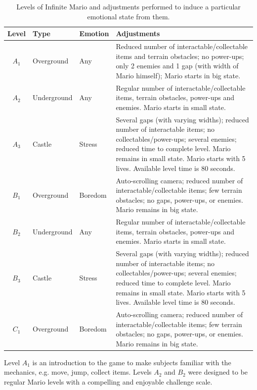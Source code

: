\begin{landscape}
\begin{table}
    \centering
    \caption{Levels of Infinite Mario and adjustments performed to induce a particular emotional state from them.}
    \label{table:experiment2-mario-levels}
    \begin{tabular}[l]{@{}cllp{9.5cm}}
        \toprule%
            \textbf{Level} & \textbf{Type} & \textbf{Emotion} & \textbf{Adjustments} \\
        \midrule%
            $A_1$ & Overground  & Any & Reduced number of interactable/collectable items and terrain obstacles; no power-ups; only 2 enemies and 1 gap (with width of Mario himself); Mario starts in big state. \\
            $A_2$ & Underground & Any & Regular number of interactable/collectable items, terrain obstacles, power-ups and enemies. Mario starts in small state. \\
            $A_3$ & Castle      & Stress  & Several gaps (with varying widths); reduced number of interactable items; no collectables/power-ups; several enemies; reduced time to complete level. Mario remains in small state. Mario starts with 5 lives. Available level time is 80 seconds. \\
            $B_1$ & Overground  & Boredom & Auto-scrolling camera; reduced number of interactable/collectable items; few terrain obstacles; no gaps, power-ups, or enemies. Mario remains in big state. \\
            $B_2$ & Underground & Any & Regular number of interactable/collectable items, terrain obstacles, power-ups and enemies. Mario starts in small state. \\
            $B_3$ & Castle      & Stress  & Several gaps (with varying widths); reduced number of interactable items; no collectables/power-ups; several enemies; reduced time to complete level. Mario remains in small state. Mario starts with 5 lives. Available level time is 80 seconds. \\
            $C_1$ & Overground  & Boredom & Auto-scrolling camera; reduced number of interactable/collectable items; few terrain obstacles; no gaps, power-ups, or enemies. Mario remains in big state. \\
        \bottomrule%
    \end{tabular}
\end{table}
\end{landscape}

Level $A_1$ is an introduction to the game to make subjects familiar with the mechanics, e.g. move, jump, collect items. Levels $A_2$ and $B_2$ were designed to be regular Mario levels with a compelling and enjoyable challenge scale.

